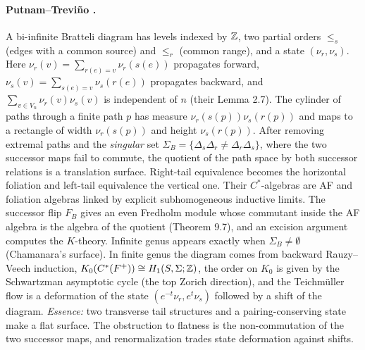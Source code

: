 \paragraph{Putnam--Trevi\~no \cite{PT}.} A bi-infinite Bratteli diagram has levels indexed by $\mathbb Z$, two partial orders $\le_s$ (edges
with a common source) and $\le_r$ (common range), and a state $(\nu_r,\nu_s)$. Here $\nu_r(v)=\sum_{r(e)=v}\nu_r(s(e))$ propagates forward,
$\nu_s(v)=\sum_{s(e)=v}\nu_s(r(e))$ propagates backward, and $\sum_{v\in V_n}\nu_r(v)\nu_s(v)$ is independent of $n$ (their Lemma 2.7). The
cylinder of paths through a finite path $p$ has measure $\nu_r(s(p))\nu_s(r(p))$ and maps to a rectangle of width $\nu_r(s(p))$ and
height $\nu_s(r(p))$. After removing extremal paths and the \emph{singular} set $\Sigma_B=\{\Delta_s\Delta_r\ne\Delta_r\Delta_s\}$, where the
two successor maps fail to commute, the quotient of the path space by both successor relations is a translation surface. Right-tail
equivalence becomes the horizontal foliation and left-tail equivalence the vertical one. Their $C^*$-algebras are AF and foliation
algebras linked by explicit subhomogeneous inductive limits. The successor flip $F_B$ gives an even Fredholm module whose commutant
inside the AF algebra is the algebra of the quotient (Theorem 9.7), and an excision argument computes the $K$-theory. Infinite
genus appears exactly when $\Sigma_B\neq\emptyset$ (Chamanara's surface). In finite genus the diagram comes from backward Rauzy--Veech
induction, $K_0(C^*(F^+))\cong H_1(S,\Sigma;\mathbb Z)$, the order on $K_0$ is given by the Schwartzman asymptotic cycle (the top Zorich
direction), and the Teichm\"uller flow is a deformation of the state $(e^{-t}\nu_r,e^{t}\nu_s)$ followed by a shift of the diagram.
\emph{Essence:} two transverse tail structures and a pairing-conserving state make a flat surface. The obstruction to flatness is the
non-commutation of the two successor maps, and renormalization trades state deformation against shifts.

